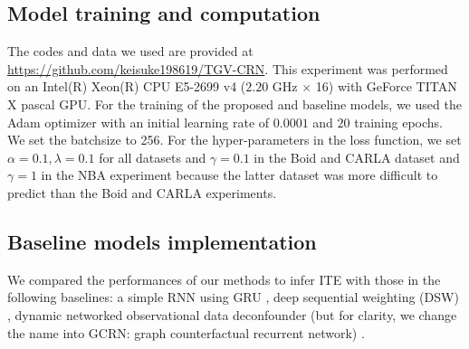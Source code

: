 \subsection{Model training and computation}
\label{app:ourtraining}
The codes and data we used are provided at \url{https://github.com/keisuke198619/TGV-CRN}.
This experiment was performed on an Intel(R) Xeon(R) CPU E5-2699 v4 ($2.20$ GHz $\times$ 16) with GeForce TITAN X pascal GPU.
For the training of the proposed and baseline models, we used the Adam optimizer \cite{Kingma15} with an initial learning rate of $0.0001$ and $20$ training epochs.
We set the batchsize to 256.
For the hyper-parameters in the loss function, we set $\alpha = 0.1, \lambda = 0.1$ for all datasets and  $\gamma = 0.1$ in the Boid and CARLA dataset and  $\gamma = 1$ in the NBA experiment because the latter dataset was more difficult to predict than the Boid and CARLA experiments.


\begin{table}[ht!]
\centering
{}
\caption{\label{tab:computation} The averaged computation time [s] among 10 sequences in two datasets.}
\end{table}
\fi


\subsection{Baseline models implementation}
\label{app:baselines}
We compared the performances of our methods to infer ITE with those in the following baselines: a simple RNN using GRU \cite{Cho14},
deep sequential weighting (DSW) \cite{liu2020estimating}, dynamic networked observational data deconfounder (but for clarity, we change the name into GCRN: graph counterfactual recurrent network) \cite{ma2021deconfounding}.

